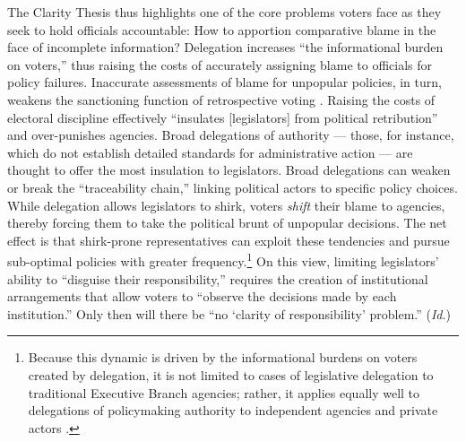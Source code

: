 \documentclass{article}
\begin{document}
The Clarity Thesis thus highlights one of the core problems voters face as they seek to hold officials accountable: How to apportion comparative blame in the face of incomplete information? Delegation increases ``the informational burden on voters,'' \citep[p. 623]{Nzelibe2010b} thus raising the costs of accurately assigning blame to officials for policy failures. Inaccurate assessments of blame for unpopular policies, in turn, weakens the sanctioning function of retrospective voting \citep{Ferejohn1986}. Raising the costs of electoral discipline effectively ``insulates [legislators] from political retribution''  \citep[p. 101]{Arnold1990} and over-punishes agencies. Broad delegations of authority --- those, for instance, which do not establish detailed standards for administrative action --- are thought to offer the most insulation to legislators.\citep{Fiorina1982} Broad delegations can weaken or break the ``traceability chain,'' linking political actors to specific policy choices. \citep{Arnold1990} While delegation allows legislators to shirk, voters \emph{shift} their blame to agencies, thereby forcing them to take the political brunt of unpopular decisions. The net effect is that shirk-prone representatives can exploit these tendencies and pursue sub-optimal policies with greater frequency.\footnote{Because this dynamic is driven by the informational burdens on voters created by delegation, it is not limited to cases of legislative delegation to traditional Executive Branch agencies; rather, it applies equally well to delegations of policymaking authority to independent agencies and private actors \citep{Rodriguez2010}.} \citep[p. 841]{Fox2011} On this view, limiting legislators' ability to ``disguise their responsibility,'' \citep[p. 47]{Fiorina1982} requires the creation of institutional arrangements that allow voters to ``observe the decisions made by each institution.'' \citep[p. 145]{Nzelibe2010b} Only then will there be ``no `clarity of responsibility' problem.'' (\emph{Id}.)  
\end{document}
